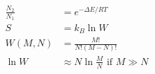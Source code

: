\begin{align*}
\frac{N_2}{N_1} &= e^{-\Delta E/RT}\\
S&=k_B\ln{W}\\
W(M,N) &= \frac{M!}{N!(M-N)!}\\
\ln W&\approx N \ln\frac{M}{N} \textrm{ if } M \gg N\\
\end{align*}